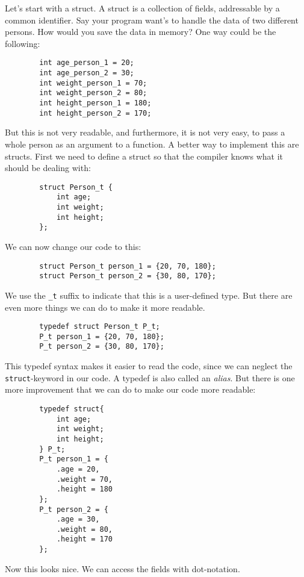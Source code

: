 \documentclass{dcbl/challenge}
\begin{document}
\begin{aufgabe}
    Let's start with a struct. 
    A struct is a collection of fields, addressable by a common identifier.
    Say your program want's to handle the data of two different persons. 
    How would you save the data in memory?
    One way could be the following:
    \begin{lstlisting}
        int age_person_1 = 20;
        int age_person_2 = 30;
        int weight_person_1 = 70;
        int weight_person_2 = 80;
        int height_person_1 = 180;
        int height_person_2 = 170;
    \end{lstlisting}
    But this is not very readable, and furthermore, it is not very easy, to pass a whole person as an argument to a function.
    A better way to implement this are structs. 
    First we need to define a struct so that the compiler knows what it should be dealing with:
    \begin{lstlisting}
        struct Person_t {
            int age;
            int weight;
            int height;
        };
    \end{lstlisting}
    We can now change our code to this:
    \begin{lstlisting}
        struct Person_t person_1 = {20, 70, 180};
        struct Person_t person_2 = {30, 80, 170};
    \end{lstlisting}
    We use the \texttt{\_t} suffix to indicate that this is a user-defined type.
    But there are even more things we can do to make it more readable. 
    \begin{lstlisting}
        typedef struct Person_t P_t;
        P_t person_1 = {20, 70, 180};
        P_t person_2 = {30, 80, 170};
    \end{lstlisting}
    This typedef syntax makes it easier to read the code, since we can neglect the \texttt{struct}-keyword in our code.
    A typedef is also called an \textit{alias}.
    But there is one more improvement that we can do to make our code more readable:
    \begin{lstlisting}
        typedef struct{
            int age;
            int weight;
            int height;
        } P_t;
        P_t person_1 = {
            .age = 20,
            .weight = 70,
            .height = 180
        };
        P_t person_2 = {
            .age = 30,
            .weight = 80,
            .height = 170
        };
    \end{lstlisting}
    Now this looks nice. 
    We can access the fields with dot-notation.
    \begin{lstlisting}

\end{lstlisting}
\end{aufgabe}
\end{document}
